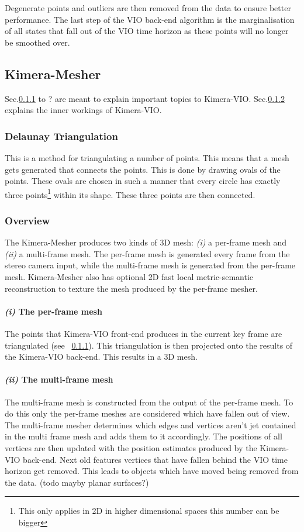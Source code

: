 \documentclass[11pt,a4paper]{article}
\begin{document}
Degenerate points and outliers are then removed from the data to ensure better performance.
The last step of the VIO back-end algorithm is the marginalisation of all states that fall out of the VIO time horizon as these points will no longer be smoothed over.


\subsection{Kimera-Mesher}
Sec.\ref{pre:delaunay} to ? are meant to explain important topics to Kimera-VIO.
Sec.\ref{Sec:K-Mesher overview} explains the inner workings of Kimera-VIO.
\subsubsection{Delaunay Triangulation} \label{pre:delaunay}
This is a method for triangulating a number of points. This means that a mesh gets generated that connects the points.
This is done by drawing ovals of the points. 
These ovals are chosen in such a manner that every circle has exactly three points\footnote{This only applies in 2D in higher dimensional spaces this number can be bigger} within its shape. 
These three points are then connected.  
\subsubsection{Overview} \label{Sec:K-Mesher overview}
The Kimera-Mesher produces two kinds of 3D mesh: \textit{(i)} a per-frame mesh and \textit{(ii)} a multi-frame mesh. The per-frame mesh is generated every frame from the stereo camera input, while the multi-frame mesh is generated from the per-frame mesh.
Kimera-Mesher also has optional 2D fast local metric-semantic reconstruction to texture the mesh produced by the per-frame mesher.
\paragraph{\textit{(i)} The per-frame mesh}
The points that Kimera-VIO front-end produces in the current key frame are triangulated (see ~\ref{pre:delaunay}).
This triangulation is then projected onto the results of the Kimera-VIO back-end. This results in a 3D mesh. 

\paragraph{\textit{(ii)} The multi-frame mesh}
The multi-frame mesh is constructed from the output of the per-frame mesh.
To do this only the per-frame meshes are considered which have fallen out of view.
The multi-frame mesher determines which edges and vertices aren't jet contained in the multi frame mesh and adds them to it accordingly. 
The positions of all vertices are then updated with the position estimates produced by the Kimera-VIO back-end.
Next old features vertices that have fallen behind the VIO time horizon get removed. 
This leads to objects which have moved being removed from the data. 
(todo mayby planar surfaces?)
\end{document}
